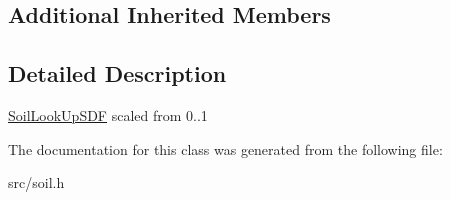 \subsection*{Additional Inherited Members}


\subsection{Detailed Description}
\hyperlink{classCPlantBox_1_1SoilLookUpSDF}{Soil\+Look\+Up\+S\+DF} scaled from 0..1 

The documentation for this class was generated from the following file\+:\begin{DoxyCompactItemize}
\item 
src/soil.\+h\end{DoxyCompactItemize}
